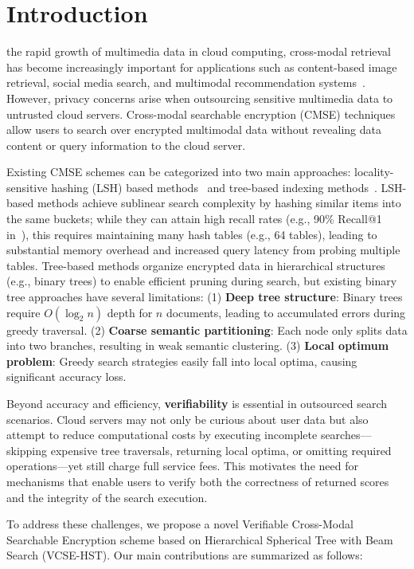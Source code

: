 \documentclass[journal]{IEEEtran}
\begin{document}
\section{Introduction}

 the rapid growth of multimedia data in cloud computing, cross-modal retrieval has become increasingly important for applications such as content-based image retrieval, social media search, and multimodal recommendation systems~\cite{radford2021learning}. However, privacy concerns arise when outsourcing sensitive multimedia data to untrusted cloud servers. Cross-modal searchable encryption (CMSE) techniques allow users to search over encrypted multimodal data without revealing data content or query information to the cloud server.

Existing CMSE schemes can be categorized into two main approaches: locality-sensitive hashing (LSH) based methods~\cite{yang2025secure,zhang2024efficient} and tree-based indexing methods~\cite{miao2022ranked,yang2022mu}. LSH-based methods achieve sublinear search complexity by hashing similar items into the same buckets; while they can attain high recall rates (e.g., 90\% Recall@1 in~\cite{yang2025secure}), this requires maintaining many hash tables (e.g., 64 tables), leading to substantial memory overhead and increased query latency from probing multiple tables. Tree-based methods organize encrypted data in hierarchical structures (e.g., binary trees) to enable efficient pruning during search, but existing binary tree approaches have several limitations: (1) \textbf{Deep tree structure}: Binary trees require $O(\log_2 n)$ depth for $n$ documents, leading to accumulated errors during greedy traversal. (2) \textbf{Coarse semantic partitioning}: Each node only splits data into two branches, resulting in weak semantic clustering. (3) \textbf{Local optimum problem}: Greedy search strategies easily fall into local optima, causing significant accuracy loss.

Beyond accuracy and efficiency, \textbf{verifiability} is essential in outsourced search scenarios. Cloud servers may not only be curious about user data but also attempt to reduce computational costs by executing incomplete searches—skipping expensive tree traversals, returning local optima, or omitting required operations—yet still charge full service fees. This motivates the need for mechanisms that enable users to verify both the correctness of returned scores and the integrity of the search execution.

To address these challenges, we propose a novel Verifiable Cross-Modal Searchable Encryption scheme based on Hierarchical Spherical Tree with Beam Search (VCSE-HST). Our main contributions are summarized as follows:
\end{document}
